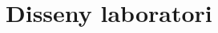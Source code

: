 
\chapter{Disseny laboratori} %



\ifpdf
    \graphicspath{{X/figures/PNG/}{X/figures/PDF/}{X/figures/}}
\else
    \graphicspath{{X/figures/EPS/}{X/figures/}}
\fi









